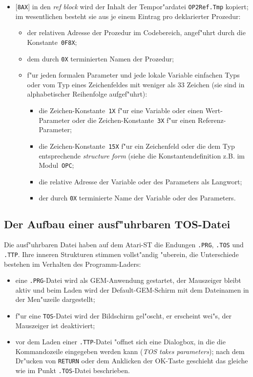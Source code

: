 \begin{itemize}
\item {}[{\tt 8AX}] in den {\it ref block\/} wird der Inhalt der Tempor"ardatei
  {\tt OP2Ref.Tmp} kopiert;
  im wesentlichen besteht sie aus je einem Eintrag pro deklarierter Prozedur:
  \begin{itemize}
  \item der relativen Adresse der Prozedur im Codebereich, angef"uhrt durch
    die Konstante~{\tt 0F8X};
  \item dem durch {\tt 0X} terminierten Namen der Prozedur;
  \item f"ur jeden formalen Parameter und jede lokale Variable einfachen
    Typs oder vom Typ eines Zeichenfeldes mit weniger als 33 Zeichen (sie
    sind in alphabetischer Reihenfolge aufgef"uhrt):
    \begin{itemize}
    \item die Zeichen-Konstante~{\tt 1X} f"ur eine Variable oder einen
      Wert-Parameter oder die Zeichen-Konstante~{\tt 3X} f"ur einen
      Referenz-Parameter;
    \item die Zeichen-Konstante~{\tt 15X} f"ur ein Zeichenfeld oder die
      dem Typ entsprechende {\it structure form\/} (siehe die Konstantendefinition
      z.B. im Modul~{\tt OPC};
    \item die relative Adresse der Variable oder des Parameters als Langwort;
    \item der durch {\tt 0X} terminierte Name der Variable oder des Parameters.
    \end{itemize}
  \end{itemize}
\end{itemize}

\subsection{Der Aufbau einer ausf"uhrbaren TOS-Datei}

Die ausf"uhrbaren Datei haben auf dem Atari-ST die Endungen {\tt .PRG},
{\tt .TOS} und {\tt .TTP}.
Ihre inneren Strukturen stimmen vollst"andig "uberein, die Unterschiede
bestehen im Verhalten des Programm-Laders:
\begin{itemize}
\item eine {\tt .PRG}-Datei wird als GEM-Anwendung gestartet, der Mauszeiger
  bleibt aktiv und beim Laden wird der Default-GEM-Schirm mit dem Dateinamen
  in der Men"uzeile dargestellt;
\item f"ur eine {\tt TOS}-Datei wird der Bildschirm gel"oscht, er erscheint
wei"s, der Mauszeiger ist deaktiviert;
\item vor dem Laden einer {\tt .TTP}-Datei "offnet sich eine Dialogbox,
  in die die Kommandozeile eingegeben werden kann ({\it TOS takes parameters\/});
  nach dem Dr"ucken von {\tt RETURN} oder dem Anklicken der OK-Taste geschieht
  das gleiche wie im Punkt {\tt .TOS}-Datei beschrieben.
\end{itemize}

